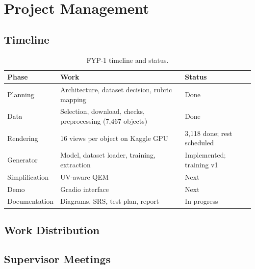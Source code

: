 \chapter{Project Management}

\section{Timeline}
\begin{table}[H]
\centering
\caption{FYP-1 timeline and status.}
\small
\begin{tabularx}{\textwidth}{lXl}
\toprule
Phase & Work & Status \\
\midrule
Planning & Architecture, dataset decision, rubric mapping & Done \\
Data & Selection, download, checks, preprocessing (7{,}467 objects) & Done \\
Rendering & 16 views per object on Kaggle GPU & 3{,}118 done; rest scheduled \\
Generator & Model, dataset loader, training, extraction & Implemented; training v1 \\
Simplification & UV-aware QEM & Next \\
Demo & Gradio interface & Next \\
Documentation & Diagrams, SRS, test plan, report & In progress \\
\bottomrule
\end{tabularx}
\end{table}

\section{Work Distribution}

\section{Supervisor Meetings}

